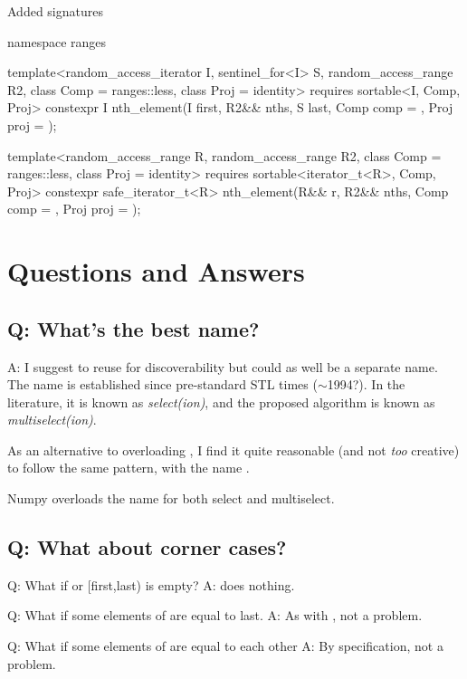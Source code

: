 Added signatures 

\begin{codeblockAdd}
namespace ranges {
  template<random_access_iterator I, sentinel_for<I> S, 
  random_access_range R2, class Comp = ranges::less, class Proj = identity>
  requires sortable<I, Comp, Proj>
  constexpr I nth_element(I first, R2&& nths, S last, Comp comp = {}, Proj proj = {});

  template<random_access_range R, 
  random_access_range R2,
  class Comp = ranges::less, class Proj = identity>
  requires sortable<iterator_t<R>, Comp, Proj>
  constexpr safe_iterator_t<R>
  nth_element(R&& r, R2&& nths, Comp comp = {}, Proj proj = {});
}
\end{codeblockAdd}

\newpage
\section{Questions and Answers}

\subsection{Q: What's the best name?}

A: I suggest to reuse  for discoverability but could as well be a separate name. The name  is established since pre-standard STL times ($\sim$1994?). In the literature\cite{Alsuwaiyel2001,Kaligosi2006,Panh2002,lent1996,Shen1997}, it is known as \emph{select(ion)}, and the proposed algorithm is known as \emph{multiselect(ion)}. 

As an alternative to overloading , I find it quite reasonable (and not \emph{too} creative) to follow the same pattern, with the name .

Numpy overloads the name  for both select and multiselect.

\subsection{Q: What about corner cases?}

Q: What if  or [first,last) is empty? A:  does nothing.

Q: What if some elements of  are equal to last. A: As with , not a problem.

Q: What if some elements of  are equal to each other A: By specification, not a problem.

